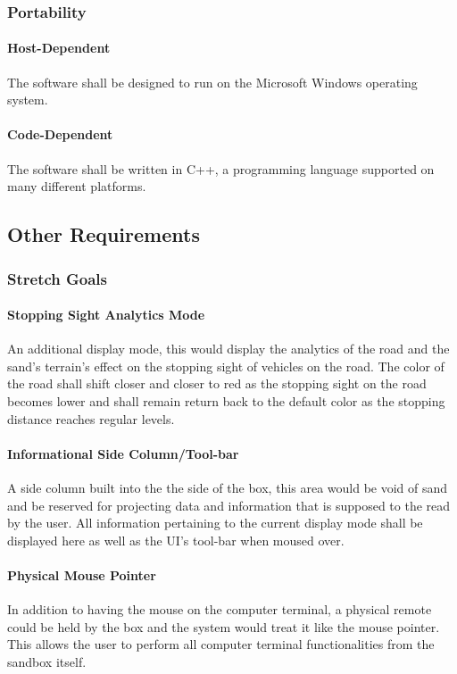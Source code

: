 \documentclass[onecolumn, draftclsnofoot,10pt, compsoc]{IEEEtran}
\begin{document}
\subsubsection{Portability}
\paragraph{Host-Dependent}
The software shall be designed to run on the Microsoft Windows operating system.
\paragraph{Code-Dependent}
The software shall be written in C++, a programming language supported on many different platforms.

\subsection{Other Requirements}
\subsubsection{Stretch Goals}
\paragraph{Stopping Sight Analytics Mode}
An additional display mode, this would display the analytics of the road and the sand's terrain's effect on the stopping sight of vehicles on the road.  The color of the road shall shift closer and closer to red as the stopping sight on the road becomes lower and shall remain return back to the default color as the stopping distance reaches regular levels.
\paragraph{Informational Side Column/Tool-bar}
A side column built into the the side of the box, this area would be void of sand and be reserved for projecting data and information that is supposed to the read by the user.  All information pertaining to the current display mode shall be displayed here as well as the UI's tool-bar when moused over.
\paragraph{Physical Mouse Pointer}
In addition to having the mouse on the computer terminal, a physical remote could be held by the box and the system would treat it like the mouse pointer.  This allows the user to perform all computer terminal functionalities from the sandbox itself.
\end{document}

